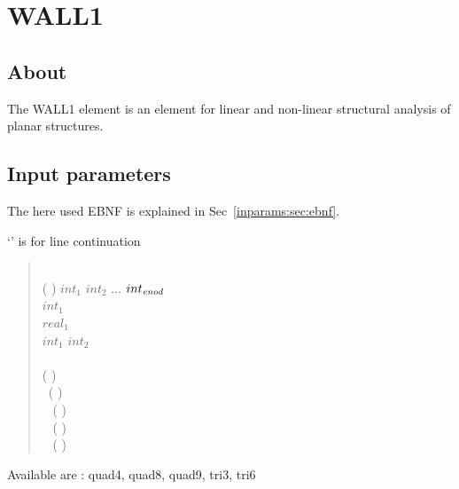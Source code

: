 


\chapter{WALL1}

\section{About}
The WALL1 element is an element for linear and non-linear structural analysis
of planar structures. 

\section{Input parameters}
The here used EBNF is explained in Sec~\ref{inparams:sec:ebnf}.

  `\cnl' is for line continuation
\begin{quote}
 \cnl \\
(  \cor {} \cor {} \cor {} \cor
{} ) $int_1$ $int_2$ $\ldots$ $int_{\mathit{enod}}$ \cnl \\
 $int_1$ \cnl \\
 $real_1$ \cnl \\
 $int_1$ $int_2$ \cnl \\
\cgb {} \cor {} \cor
{} \cge \cnl \\
(  \cor {} \cor {} ) \cnl \\
\ccb\ (  \cor {} ) \cce \cnl \\
\ccb\  (  \cor {} ) \cce \cnl \\
\ccb\  (  \cor {} ) \cce \cnl \\
\ccb\  (  \cor {} \cor
{} ) \cce
\end{quote}

Available are : quad4, quad8, quad9, tri3, tri6

